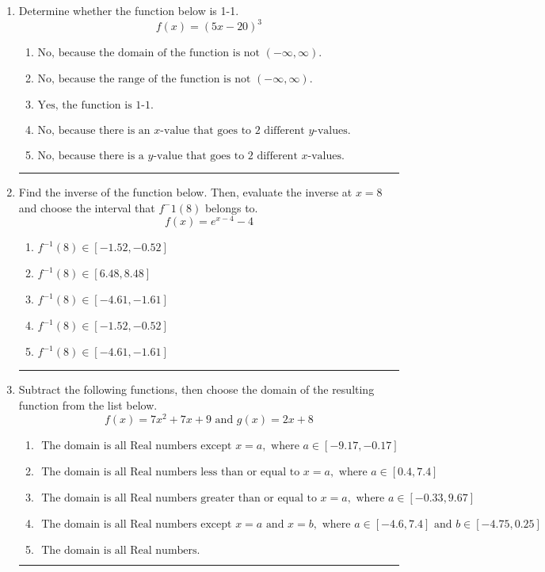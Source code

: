 \documentclass[14pt]{extbook}
\newcommand{\litem}[1]{\item#1\hspace*{-1cm}\rule{\textwidth}{0.4pt}}
\begin{document}
\begin{enumerate}
\litem{
Determine whether the function below is 1-1.\[ f(x) = (5 x - 20)^3 \]\begin{enumerate}[label=\Alph*.]
\item \( \text{No, because the domain of the function is not $(-\infty, \infty)$.} \)
\item \( \text{No, because the range of the function is not $(-\infty, \infty)$.} \)
\item \( \text{Yes, the function is 1-1.} \)
\item \( \text{No, because there is an $x$-value that goes to 2 different $y$-values.} \)
\item \( \text{No, because there is a $y$-value that goes to 2 different $x$-values.} \)

\end{enumerate} }
\litem{
Find the inverse of the function below. Then, evaluate the inverse at $x = 8$ and choose the interval that $f^-1(8)$ belongs to.\[ f(x) = e^{x-4}-4 \]\begin{enumerate}[label=\Alph*.]
\item \( f^{-1}(8) \in [-1.52, -0.52] \)
\item \( f^{-1}(8) \in [6.48, 8.48] \)
\item \( f^{-1}(8) \in [-4.61, -1.61] \)
\item \( f^{-1}(8) \in [-1.52, -0.52] \)
\item \( f^{-1}(8) \in [-4.61, -1.61] \)

\end{enumerate} }
\litem{
Subtract the following functions, then choose the domain of the resulting function from the list below.\[ f(x) = 7x^{2} +7 x + 9 \text{ and } g(x) = 2x + 8 \]\begin{enumerate}[label=\Alph*.]
\item \( \text{ The domain is all Real numbers except } x = a, \text{ where } a \in [-9.17, -0.17] \)
\item \( \text{ The domain is all Real numbers less than or equal to } x = a, \text{ where } a \in [0.4, 7.4] \)
\item \( \text{ The domain is all Real numbers greater than or equal to } x = a, \text{ where } a \in [-0.33, 9.67] \)
\item \( \text{ The domain is all Real numbers except } x = a \text{ and } x = b, \text{ where } a \in [-4.6, 7.4] \text{ and } b \in [-4.75, 0.25] \)
\item \( \text{ The domain is all Real numbers. } \)


\end{enumerate}}
\end{enumerate}
\end{document}
